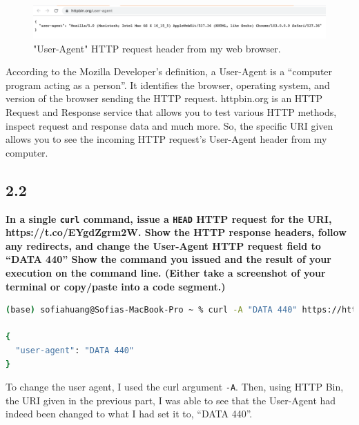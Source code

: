 \documentclass[12pt]{article}
\begin{document}
\begin{figure}[h]
    \centering
    \includegraphics[trim=0 20 10 50, clip, width=\textwidth] {useragent.png}
    \caption{"User-Agent" HTTP request header from my web browser.}
    \label{fig:user-agent}
\end{figure}

According to the Mozilla Developer's definition, a User-Agent is a ``computer program acting as a person''. It identifies the browser, operating system, and version of the browser sending the HTTP request. httpbin.org is an HTTP Request and Response service that allows you to test various HTTP methods, inspect request and response data and much more. So, the specific URI given allows you to see the incoming HTTP request's User-Agent header from my computer. 

\subsection*{2.2}
\noindent \textbf{In a single \lstinline{curl} command, issue a \lstinline{HEAD} HTTP request for the URI, https://t.co/EYgdZgrm2W. Show the HTTP response headers, follow any redirects, and change the User-Agent HTTP request field to ``DATA 440'' Show the command you issued and the result of your execution on the command line. (Either take a screenshot of your terminal or copy/paste into a code segment.)}

\begin{lstlisting}[language=bash, caption=changing User-Agent, label=lst:copy]
(base) sofiahuang@Sofias-MacBook-Pro ~ % curl -A "DATA 440" https://httpbin.org/user-agent

{
  "user-agent": "DATA 440"
}
\end{lstlisting}

To change the user agent, I used the curl argument \lstinline{-A}. Then, using HTTP Bin, the URI given in the previous part, I was able to see that the User-Agent had indeed been changed to what I had set it to, ``DATA 440''. 
\end{document}
